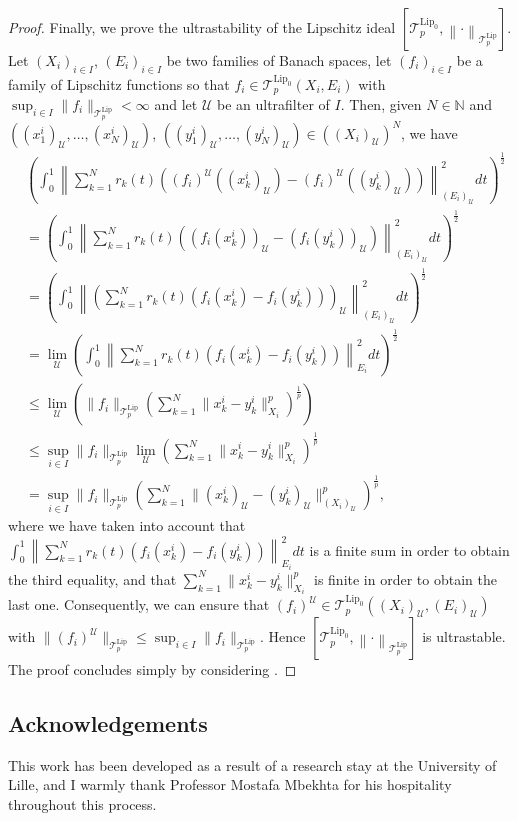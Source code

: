 \documentclass[12pt]{amsart}
\def\U{\mathcal{U}}
\def\T{\mathcal{T}}
\def\N{\mathbb{N}}
\def\Lip{\mathrm{Lip}_0}
\def\Lipnorm{\mathrm{Lip}}
\begin{document}
\begin{proof}
	Finally, we prove the ultrastability of the Lipschitz ideal $[\T_p^{\Lip},\left\|\cdot\right\|_{\T_p^{\Lipnorm}}]$. Let $(X_i)_{i\in I}$, $(E_i)_{i\in I}$ be two families of Banach spaces, let $(f_i)_{i\in I}$ be a family of Lipschitz functions so that $f_i \in \T_p^{\Lip}(X_i,E_i)$ with $\sup_{i\in I} \|f_i\|_{\T_p^{\Lipnorm}} < \infty$ and let $\mathcal{U}$ be an ultrafilter of $I$. Then, given $N\in\N$ and $((x_1^i)_\U,\ldots, (x_N^i)_\U)$, $((y_1^i)_\U, \ldots, (y_N^i)_\U) \in ((X_i)_\U)^N$, we have
	\begin{align*}
		&\left( \int_{0}^{1} \left\| \sum_{k=1}^{N} r_k(t)\left((f_i)^\U((x_k^i)_\U)-(f_i)^\U((y_k^i)_\U)\right) \right\|_{(E_i)_\U}^2 dt \right)^{\frac{1}{2}}\\
		&= \left( \int_{0}^{1} \left\| \sum_{k=1}^{N} r_k(t)\left((f_i(x_k^i))_\U-(f_i(y_k^i))_\U\right) \right\|_{(E_i)_\U}^2 dt \right)^{\frac{1}{2}}\\
		&= \left( \int_{0}^{1} \left\| \left(\sum_{k=1}^{N} r_k(t)(f_i(x_k^i)-f_i(y_k^i))\right)_\U \right\|_{(E_i)_\U}^2 dt \right)^{\frac{1}{2}}\\
		&= \lim_\U \left( \int_{0}^{1} \left\| \sum_{k=1}^{N} r_k(t)(f_i(x_k^i)-f_i(y_k^i)) \right\|_{E_i}^2 dt \right)^{\frac{1}{2}}\\
		&\leq \lim_\U \left(\|f_i\|_{\T_p^{\Lipnorm}} \left( \sum_{k=1}^{N} \|x_k^i-y_k^i\|_{X_i}^p \right)^{\frac{1}{p}}\right)\\
		&\leq \sup_{i\in I} \|f_i\|_{\T_p^{\Lipnorm}} \lim_\U \left( \sum_{k=1}^{N} \|x_k^i-y_k^i\|_{X_i}^p \right)^{\frac{1}{p}}\\
		&= \sup_{i\in I} \|f_i\|_{\T_p^{\Lipnorm}} \left( \sum_{k=1}^{N} \|(x_k^i)_\U-(y_k^i)_\U\|_{(X_i)_\U}^p \right)^{\frac{1}{p}},
	\end{align*}
	where we have taken into account that $\int_{0}^{1}\left\|\sum_{k=1}^{N}r_k(t)(f_i(x_k^i)-f_i(y_k^i))\right\|_{E_i}^2 dt$ is a finite sum in order to obtain the third equality, and that $\sum_{k=1}^{N}\|x_k^i-y_k^i\|_{X_i}^p$ is finite in order to obtain the last one. Consequently, we can ensure that $(f_i)^\U \in \T_p^{\Lip}((X_i)_\U,(E_i)_\U)$ with $\|(f_i)^\U\|_{\T_p^{\Lipnorm}} \leq \sup_{i\in I} \|f_i\|_{\T_p^{\Lipnorm}}$. Hence $[\T_p^{\Lip},\left\|\cdot\right\|_{\T_p^{\Lipnorm}}]$ is ultrastable. The proof concludes simply by considering \cite[Theorem 3.6]{AlbTur-24}.
	\end{proof}

	\subsection*{Acknowledgements} This work has been developed as a result of a research stay at the University of Lille, and I warmly thank Professor Mostafa Mbekhta for his hospitality throughout this process.
\end{document}
